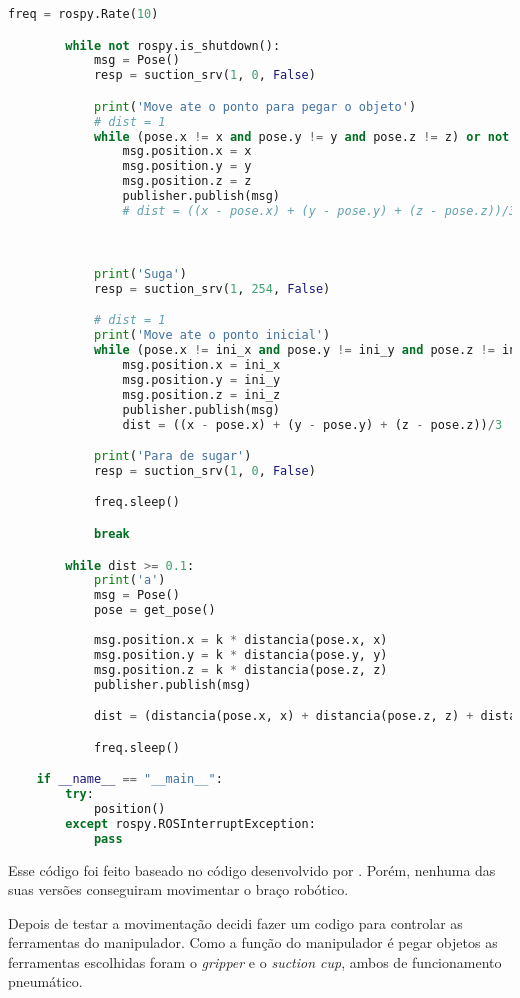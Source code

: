 \begin{lstlisting}[language=Python]
        freq = rospy.Rate(10)

        while not rospy.is_shutdown():
            msg = Pose()
            resp = suction_srv(1, 0, False)

            print('Move ate o ponto para pegar o objeto')
            # dist = 1
            while (pose.x != x and pose.y != y and pose.z != z) or not rospy.is_shutdown():
                msg.position.x = x
                msg.position.y = y
                msg.position.z = z
                publisher.publish(msg)
                # dist = ((x - pose.x) + (y - pose.y) + (z - pose.z))/3

                

            print('Suga')
            resp = suction_srv(1, 254, False)

            # dist = 1
            print('Move ate o ponto inicial')
            while (pose.x != ini_x and pose.y != ini_y and pose.z != ini_z) or not rospy.is_shutdown():
                msg.position.x = ini_x
                msg.position.y = ini_y
                msg.position.z = ini_z
                publisher.publish(msg)
                dist = ((x - pose.x) + (y - pose.y) + (z - pose.z))/3

            print('Para de sugar')
            resp = suction_srv(1, 0, False)

            freq.sleep()

            break

        while dist >= 0.1:
            print('a')
            msg = Pose()
            pose = get_pose()
            
            msg.position.x = k * distancia(pose.x, x)
            msg.position.y = k * distancia(pose.y, y)
            msg.position.z = k * distancia(pose.z, z)
            publisher.publish(msg)

            dist = (distancia(pose.x, x) + distancia(pose.z, z) + distancia(pose.y, y)) / 3

            freq.sleep()

    if __name__ == "__main__":
        try:
            position()
        except rospy.ROSInterruptException:
            pass
\end{lstlisting}

Esse código foi feito baseado no código desenvolvido por \cite{Dobotand76:online}. Porém, nenhuma das suas versões conseguiram movimentar o braço robótico.

Depois de testar a movimentação decidi fazer um codigo para controlar as ferramentas do manipulador. Como a função do manipulador é pegar objetos as ferramentas escolhidas foram o \textit{gripper} e o \textit{suction cup}, ambos de funcionamento pneumático.

